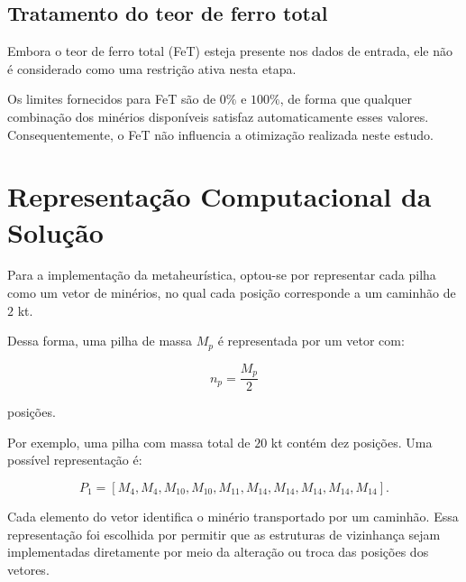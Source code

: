 \documentclass[12pt,a4paper]{article}
\begin{document}

\subsection{Tratamento do teor de ferro total}

Embora o teor de ferro total (FeT) esteja presente nos dados de entrada,
ele não é considerado como uma restrição ativa nesta etapa.

Os limites fornecidos para FeT são de $0\%$ e $100\%$, de forma que
qualquer combinação dos minérios disponíveis satisfaz automaticamente
esses valores. Consequentemente, o FeT não influencia a otimização
realizada neste estudo.



\section{Representação Computacional da Solução}

Para a implementação da metaheurística, optou-se por representar cada
pilha como um vetor de minérios, no qual cada posição corresponde a um
caminhão de $2$ kt.

Dessa forma, uma pilha de massa $M_p$ é representada por um vetor com:

\begin{equation}
n_p =
\frac{M_p}{2}
\end{equation}

posições.

Por exemplo, uma pilha com massa total de $20$ kt contém dez posições.
Uma possível representação é:

\begin{equation}
P_1 =
[M_4,M_4,M_{10},M_{10},M_{11},
M_{14},M_{14},M_{14},M_{14},M_{14}].
\end{equation}

Cada elemento do vetor identifica o minério transportado por um caminhão.
Essa representação foi escolhida por permitir que as estruturas de
vizinhança sejam implementadas diretamente por meio da alteração ou troca
das posições dos vetores.


\end{document}
